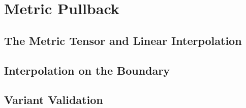 \section{Metric Pullback}


\subsection{The Metric Tensor and Linear Interpolation}


\subsection{Interpolation on the Boundary}

\subsection{Variant Validation}

